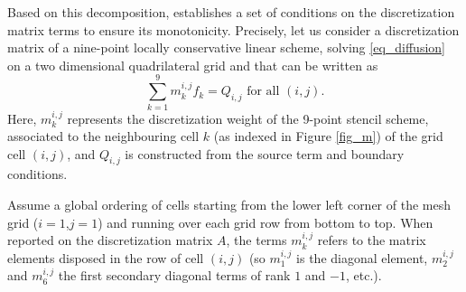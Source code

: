 \documentclass[final,11pt]{elsarticle}
\begin{document}
Based on this decomposition, \cite{nordbotten2007} establishes a set of conditions on the discretization matrix terms to ensure its monotonicity. Precisely, let us consider a discretization matrix of a nine-point locally conservative linear scheme, solving \eqref{eq_diffusion} on a two dimensional quadrilateral grid and that can be written as
\begin{equation}
    \sum_{k=1}^9m_k^{i,j}f_k=Q_{i,j}\mbox{ for all $(i,j)$}.
    \label{eq_m}
\end{equation}
Here, $m_{k}^{i,j}$ represents the discretization weight of the 9-point stencil scheme, associated to the neighbouring cell $k$ (as indexed in Figure \ref{fig_m}) of the grid cell $(i,j)$, and $Q_{i,j}$ is constructed from the source term and boundary conditions.

Assume a global ordering of cells starting from the lower left corner of the mesh grid ($i=1$,$j=1$) and running over each grid row from bottom to top. When reported on the discretization matrix $A$, the terms $m_k^{i,j}$ refers to the matrix elements disposed in the row of cell $(i,j)$ (so $m_1^{i,j}$ is the diagonal element, $m_2^{i,j}$ and $m_6^{i,j}$ the first secondary diagonal terms of rank $1$ and $-1$, etc.).
\end{document}
